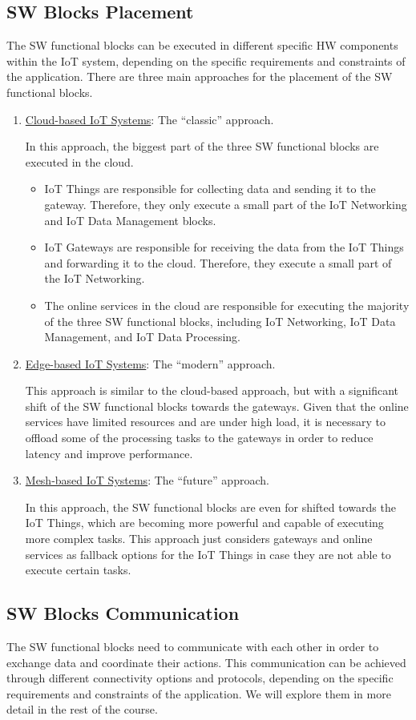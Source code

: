 \subsection{SW Blocks Placement}

The SW functional blocks can be executed in different specific HW components within the IoT system, depending on the specific requirements and constraints of the application. There are three main approaches for the placement of the SW functional blocks.
\begin{enumerate}
    \item \ul{Cloud-based IoT Systems}: The ``classic'' approach.
    
    In this approach, the biggest part of the three SW functional blocks are executed in the cloud.
    \begin{itemize}
        \item IoT Things are responsible for collecting data and sending it to the gateway. Therefore, they only execute a small part of the IoT Networking and IoT Data Management blocks.
        \item IoT Gateways are responsible for receiving the data from the IoT Things and forwarding it to the cloud. Therefore, they execute a small part of the IoT Networking.
        \item The online services in the cloud are responsible for executing the majority of the three SW functional blocks, including IoT Networking, IoT Data Management, and IoT Data Processing.
    \end{itemize}

    \item \ul{Edge-based IoT Systems}: The ``modern'' approach.
    
    This approach is similar to the cloud-based approach, but with a significant shift of the SW functional blocks towards the gateways. Given that the online services have limited resources and are under high load, it is necessary to offload some of the processing tasks to the gateways in order to reduce latency and improve performance.

    \item \ul{Mesh-based IoT Systems}: The ``future'' approach.
    
    In this approach, the SW functional blocks are even for shifted towards the IoT Things, which are becoming more powerful and capable of executing more complex tasks. This approach just considers gateways and online services as fallback options for the IoT Things in case they are not able to execute certain tasks.
\end{enumerate}

\subsection{SW Blocks Communication}

The SW functional blocks need to communicate with each other in order to exchange data and coordinate their actions. This communication can be achieved through different connectivity options and protocols, depending on the specific requirements and constraints of the application. We will explore them in more detail in the rest of the course.